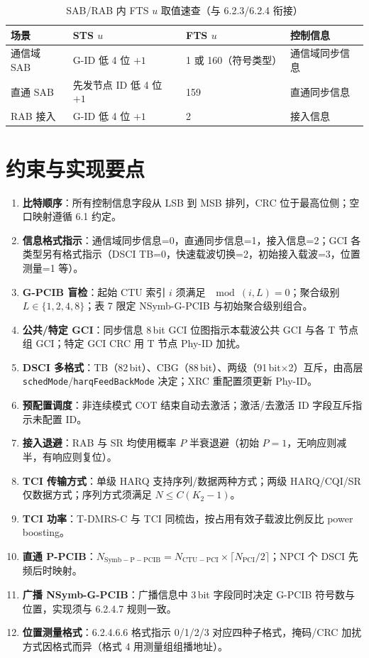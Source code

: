 \documentclass[11pt,a4paper]{ctexart}
\begin{document}
\begin{table}[h]
\centering
\small
\caption{SAB/RAB 内 FTS $u$ 取值速查（与 6.2.3/6.2.4 衔接）}
\begin{tabular}{llll}
\toprule
\textbf{场景} & \textbf{STS $u$} & \textbf{FTS $u$} & \textbf{控制信息} \\
\midrule
通信域 SAB & G-ID 低 4 位 $+1$ & 1 或 160（符号类型） & 通信域同步信息 \\
直通 SAB & 先发节点 ID 低 4 位 $+1$ & 159 & 直通同步信息 \\
RAB 接入 & G-ID 低 4 位 $+1$ & 2 & 接入信息 \\
\bottomrule
\end{tabular}
\end{table}

\section{约束与实现要点}

\begin{enumerate}[nosep]
  \item \textbf{比特顺序}：所有控制信息字段从 LSB 到 MSB 排列，CRC 位于最高位侧；空口映射遵循 6.1 约定。
  \item \textbf{信息格式指示}：通信域同步信息=0，直通同步信息=1，接入信息=2；GCI 各类型另有格式指示（DSCI TB=0，快速载波切换=2，初始接入载波=3，位置测量=1 等）。
  \item \textbf{G-PCIB 盲检}：起始 CTU 索引 $i$ 须满足 $\mod(i,L)=0$；聚合级别 $L \in \{1,2,4,8\}$；表 7 限定 NSymb-G-PCIB 与初始聚合级别组合。
  \item \textbf{公共/特定 GCI}：同步信息 8\,bit GCI 位图指示本载波公共 GCI 与各 T 节点组 GCI；特定 GCI CRC 用 T 节点 Phy-ID 加扰。
  \item \textbf{DSCI 多格式}：TB（82\,bit）、CBG（88\,bit）、两级（91\,bit$\times$2）互斥，由高层 \texttt{schedMode}/\texttt{harqFeedBackMode} 决定；XRC 重配置须更新 Phy-ID。
  \item \textbf{预配置调度}：非连续模式 COT 结束自动去激活；激活/去激活 ID 字段互斥指示未配置 ID。
  \item \textbf{接入退避}：RAB 与 SR 均使用概率 $P$ 半衰退避（初始 $P=1$，无响应则减半，有响应则复位）。
  \item \textbf{TCI 传输方式}：单级 HARQ 支持序列/数据两种方式；两级 HARQ/CQI/SR 仅数据方式；序列方式须满足 $N \leq C(K_2-1)$。
  \item \textbf{TCI 功率}：T-DMRS-C 与 TCI 同梳齿，按占用有效子载波比例反比 power boosting。
  \item \textbf{直通 P-PCIB}：$N_{\mathrm{Symb-P-PCIB}} = N_{\mathrm{CTU-PCI}} \times \lceil N_{\mathrm{PCI}}/2 \rceil$；NPCI 个 DSCI 先频后时映射。
  \item \textbf{广播 NSymb-G-PCIB}：广播信息中 3\,bit 字段同时决定 G-PCIB 符号数与位置，实现须与 6.2.4.7 规则一致。
  \item \textbf{位置测量格式}：6.2.4.6.6 格式指示 0/1/2/3 对应四种子格式，掩码/CRC 加扰方式因格式而异（格式 4 用测量组组播地址）。
\end{enumerate}
\end{document}
